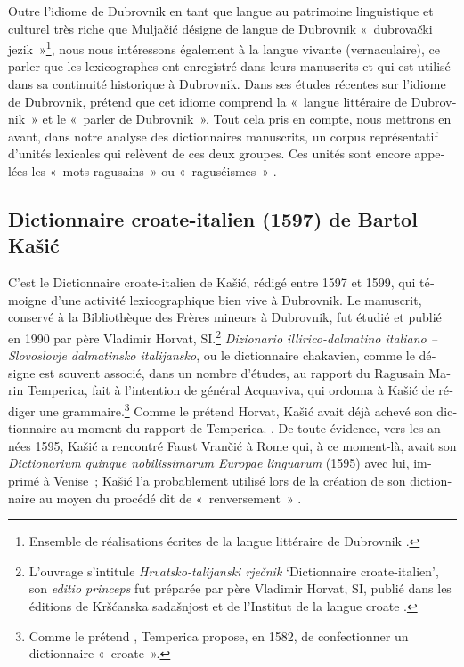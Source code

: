 \documentclass[output=paper,colorlinks,citecolor=brown,arabicfont,chinesefont,booklanguage=french]{langscibook}
\begin{document}
\begin{otherlanguage}{french}
Outre l’idiome de Dubrovnik en tant que langue au patrimoine linguistique et culturel très riche que Muljačić désigne de langue de Dubrovnik «~dubrovački jezik~»\footnote{Ensemble de réalisations écrites de la langue littéraire de Dubrovnik \citep{Muljacic2001}.},  nous nous intéressons également à la langue vivante (vernaculaire), ce parler que les lexicographes ont enregistré dans leurs manuscrits et qui est utilisé dans sa continuité historique à Dubrovnik. Dans ses études récentes sur l’idiome de Dubrovnik, \citet{Lovric_jovic2014} prétend que cet idiome comprend la «~langue littéraire de Dubrovnik~» et le «~parler de Dubrovnik~». Tout cela pris en compte, nous mettrons en avant, dans notre analyse des dictionnaires manuscrits, un corpus représentatif d’unités lexicales qui relèvent de ces deux groupes. Ces unités sont encore appelées les «~mots ragusains~» ou «~raguséismes~» \citep{Gabric_bagaric2002}.

\subsection{Dictionnaire croate-italien (1597) de Bartol Kašić}

C’est le Dictionnaire croate-italien de Kašić, rédigé entre 1597 et 1599, qui témoigne d’une activité lexicographique bien vive à Dubrovnik. Le manuscrit, conservé à la Bibliothèque des Frères mineurs à Dubrovnik, fut étudié et publié en 1990 par père Vladimir Horvat, SI.\footnote{L’ouvrage s’intitule \emph{Hrvatsko-talijanski rječnik} ‘Dictionnaire croate-italien’, son \emph{editio princeps} fut préparée par père Vladimir Horvat, SI, publié dans les éditions de Kršćanska sadašnjost et de l’Institut de la langue croate \citep{Horvat1990}.}  \emph{Dizionario illirico-dalmatino italiano – Slovoslovje dalmatinsko italijansko}, ou le dictionnaire chakavien, comme le désigne  \citet{Mitrovic1909} est souvent associé, dans un nombre d’études, au rapport du Ragusain Marin Temperica, fait à l’intention de général Acquaviva, qui ordonna à Kašić de rédiger une grammaire.\footnote{Comme le prétend \citet{Putanec2000}, Temperica propose, en 1582, de confectionner un dictionnaire «~croate~».}  Comme le prétend Horvat, Kašić avait déjà achevé son dictionnaire au moment du rapport de Temperica. \citep[XV]{Horvat1990}. De toute évidence, vers les années 1595, Kašić a rencontré Faust Vrančić à Rome qui, à ce moment-là, avait son \emph{Dictionarium quinque nobilissimarum Europae linguarum} (1595) avec lui, imprimé à Venise~; Kašić l’a probablement utilisé lors de la création de son dictionnaire au moyen du procédé dit de «~renversement~» \citep[97]{Horvat1999}.


\end{otherlanguage}
\end{document}
